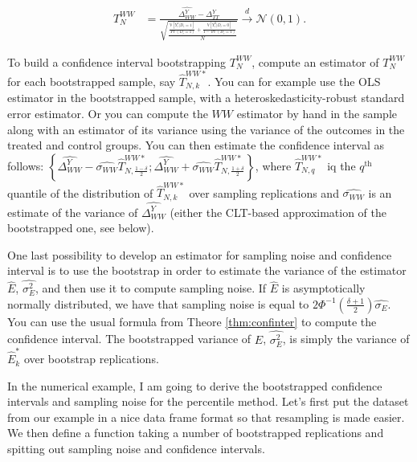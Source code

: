 \documentclass[]{book}
\newcommand{\var}[1]{\mathbb{V}[ #1 ]}
\theoremstyle{definition}
\theoremstyle{definition}
\theoremstyle{definition}
\theoremstyle{remark}
\let\BeginKnitrBlock\begin \let\EndKnitrBlock\end
\begin{document}
\begin{align*}
  T_N^{WW} & = \frac{\hat{\Delta^Y_{WW}}-\Delta^Y_{TT}}{\sqrt{\frac{\frac{\var{Y_i^1|D_i=1}}{\Pr(D_i=1)}+\frac{\var{Y_i^0|D_i=0}}{1-\Pr(D_i=1)}}{N}}} \stackrel{d}{\rightarrow}\mathcal{N}\left(0,1\right).
\end{align*}

To build a confidence interval bootstrapping \(T_N^{WW}\), compute an
estimator of \(T_N^{WW}\) for each bootstrapped sample, say
\(\hat{T}_{N,k}^{WW*}\). You can for example use the OLS estimator in
the bootstrapped sample, with a heteroskedasticity-robust standard error
estimator. Or you can compute the \(WW\) estimator by hand in the sample
along with an estimator of its variance using the variance of the
outcomes in the treated and control groups. You can then estimate the
confidence interval as follows:
\(\left\{\hat{\Delta^Y_{WW}}-\hat{\sigma_{WW}}\hat{T}^{WW*}_{N,\frac{1-\delta}{2}};\hat{\Delta^Y_{WW}}+\hat{\sigma_{WW}}\hat{T}^{WW*}_{N,\frac{1+\delta}{2}}\right\}\),
where \(\hat{T}^{WW*}_{N,q}\) iq the \(q^{\text{th}}\) quantile of the
distribution of \(\hat{T}_{N,k}^{WW*}\) over sampling replications and
\(\hat{\sigma_{WW}}\) is an estimate of the variance of
\(\hat{\Delta^Y_{WW}}\) (either the CLT-based approximation of the
bootstrapped one, see below).

\BeginKnitrBlock{remark}
\iffalse{} {Remark. } \fi{}One last possibility to develop an estimator
for sampling noise and confidence interval is to use the bootstrap in
order to estimate the variance of the estimator \(\hat{E}\),
\(\hat{\sigma^2_{E}}\), and then use it to compute sampling noise. If
\(\hat{E}\) is asymptotically normally distributed, we have that
sampling noise is equal to
\(2\Phi^{-1}\left(\frac{\delta+1}{2}\right)\hat{\sigma_{E}}\). You can
use the usual formula from Theore \ref{thm:confinter} to compute the
confidence interval. The bootstrapped variance of \(\hat{E}\),
\(\hat{\sigma^2_{E}}\), is simply the variance of \(\hat{E}^*_k\) over
bootstrap replications.
\EndKnitrBlock{remark}

\BeginKnitrBlock{example}
\protect\hypertarget{exm:unnamed-chunk-59}{}{\label{exm:unnamed-chunk-59}
}In the numerical example, I am going to derive the bootstrapped
confidence intervals and sampling noise for the percentile method. Let's
first put the dataset from our example in a nice data frame format so
that resampling is made easier. We then define a function taking a
number of bootstrapped replications and spitting out sampling noise and
confidence intervals.
\EndKnitrBlock{example}
\end{document}
